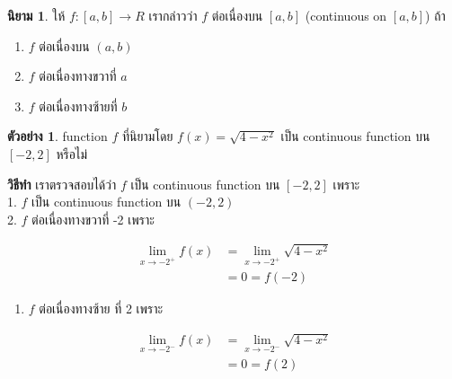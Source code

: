 \documentclass[
]{book}
\providecommand{\tightlist}{%
  \setlength{\itemsep}{0pt}\setlength{\parskip}{0pt}}
\theoremstyle{definition}
\newtheorem{definition}{นิยาม}[chapter]
\theoremstyle{definition}
\newtheorem{example}{ตัวอย่าง}[chapter]
\theoremstyle{definition}
\theoremstyle{definition}
\theoremstyle{remark}
\begin{document}
\begin{definition}

ให้ \(f : \left[ a,b\right] \rightarrow R\) เรากล่าวว่า \(f\) ต่อเนื่องบน
\(\left[ a,b\right]\) (continuous on \(\left[ a,b\right]\)) ถ้า

\begin{enumerate}
\def\labelenumi{\arabic{enumi}.}
\item
  \(f\) ต่อเนื่องบน \((a,b)\)
\item
  \(f\) ต่อเนื่องทางขวาที่ \(a\)
\item
  \(f\) ต่อเนื่องทางซ้ายที่ \(b\)
\end{enumerate}

\end{definition}

\begin{example}
\protect\hypertarget{exm:ex-cont-4}{}\label{exm:ex-cont-4}function \(f\) ที่นิยามโดย \(f\left( x\right) =\sqrt{4-x^{2}}\) เป็น continuous
function บน \(\left[ -2,2\right]\) หรือไม่
\end{example}

\textbf{วิธีทำ} เราตรวจสอบได้ว่า \(f\) เป็น continuous function บน
\(\left[ -2,2\right]\) เพราะ\\
1. \(f\) เป็น continuous function บน \(\left( -2,2\right)\)\\
2. \(f\) ต่อเนื่องทางขวาที่ -2 เพราะ  

\begin{equation}
  \begin{aligned}
    \underset{x\rightarrow -2^{+}}{\lim}f(x)
        &=\underset{x\rightarrow -2^{+}}{\lim}\sqrt{4-x^{2}} \\
        &=0=f\left( -2\right)
  \end{aligned}
\end{equation}

\begin{enumerate}
\def\labelenumi{\arabic{enumi}.}
\setcounter{enumi}{2}
\tightlist
\item
  \(f\) ต่อเนื่องทางซ้าย ที่ 2 เพราะ
\end{enumerate}

\begin{equation}
  \begin{aligned}
        \underset{x\rightarrow -2^{-}}{\lim}f(x)
        &=\underset{x\rightarrow -2^{-}}{\lim}\sqrt{4-x^{2}} \\
        &=0 =f\left( 2\right)
  \end{aligned}
\end{equation}
\end{document}
